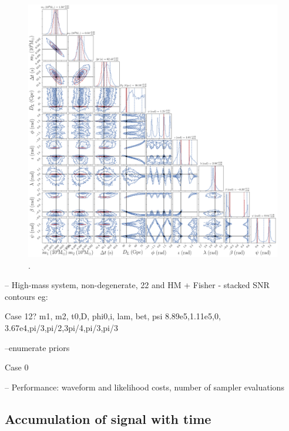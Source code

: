 \documentclass[aps,showpacs,twocolumn,prd,superscriptaddress,nofootinbib]{revtex4-1}
\begin{document}
\begin{figure}
  \centering
  \includegraphics[width=.98\linewidth]{../plots/corner_smbh_case9_ptmcmc_22_hm.png}
  \caption{.}
  \label{fig:PEsmbh22hmCase0}
\end{figure}

-- High-mass system, non-degenerate, 22 and HM + Fisher - stacked SNR contours
eg:

Case 12?
m1,    m2,    t0,D,     phi0,i,   lam,  bet, psi
8.89e5,1.11e5,0, 3.67e4,pi/3,pi/2,3pi/4,pi/3,pi/3

--enumerate priors

Case 0

-- Performance: waveform and likelihood costs, number of sampler evaluations


\subsection{Accumulation of signal with time}
\label{sec:SMBHPEacctime}
\end{document}

